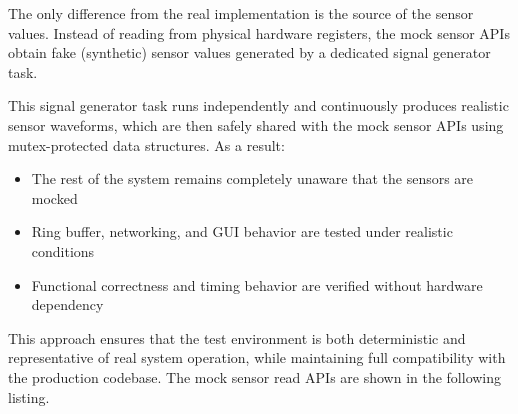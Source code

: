 The only difference from the real implementation is the source of the sensor 
values. Instead of reading from physical hardware registers, the mock sensor APIs 
obtain fake (synthetic) sensor values generated by a dedicated signal generator 
task.

This signal generator task runs independently and continuously produces realistic 
sensor waveforms, which are then safely shared with the mock sensor APIs using 
mutex-protected data structures. As a result:

\begin{itemize}
    \item The rest of the system remains completely unaware that the sensors are mocked
    \item Ring buffer, networking, and GUI behavior are tested under realistic conditions
    \item Functional correctness and timing behavior are verified without hardware dependency
\end{itemize}

This approach ensures that the test environment is both deterministic and 
representative of real system operation, while maintaining full compatibility with 
the production codebase. The mock sensor read APIs are shown in the following listing.



